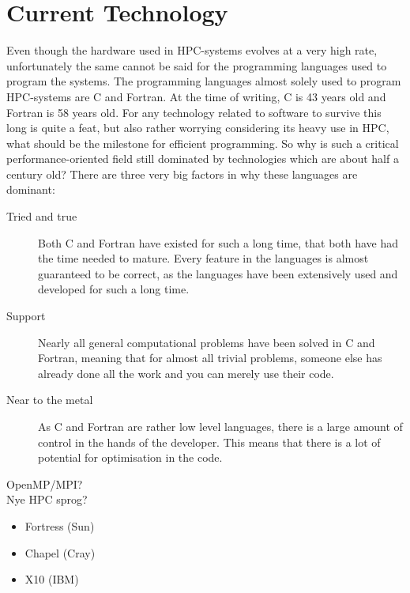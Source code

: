\section{Current Technology}
Even though the hardware used in HPC-systems evolves at a very high rate, unfortunately the same cannot be said for the programming languages used to program the systems. The programming languages almost solely used to program HPC-systems are C and Fortran. At the time of writing, C is 43 years old and Fortran is 58 years old. For any technology related to software to survive this long is quite a feat, but also rather worrying considering its heavy use in HPC, what should be the milestone for efficient programming.
So why is such a critical performance-oriented field still dominated by technologies which are about half a century old? There are three very big factors in why these languages are dominant:
\begin{description}
	\item [Tried and true]
	Both C and Fortran have existed for such a long time, that both have had the time needed to mature. Every feature in the languages is almost guaranteed to be correct, as the languages have been extensively used and developed for such a long time.
	\item [Support]
	Nearly all general computational problems have been solved in C and Fortran, meaning that for almost all trivial problems, someone else has already done all the work and you can merely use their code.
	\item [Near to the metal]
	As C and Fortran are rather low level languages, there is a large amount of control in the hands of the developer. This means that there is a lot of potential for optimisation in the code.
\end{description}

OpenMP/MPI?\\
Nye HPC sprog?
\begin{itemize}
	\item Fortress (Sun)
	\item Chapel (Cray)
	\item X10 (IBM)
\end{itemize}
